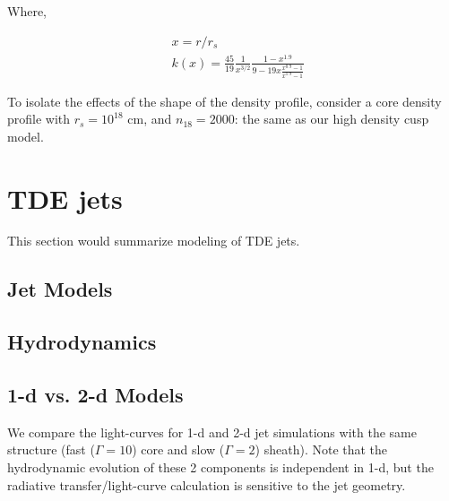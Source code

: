 \documentclass[usenatbib,fleqn]{mnras}
\newcommand{\Mbh}[1][]{M_{\bullet#1}}
\begin{document}
Where, 

\begin{align}
  &x=r/r_s\\\nonumber
  &k(x)=\frac{45}{19} \frac{1}{x^{3/2}} \frac{1-x^{1.9}}{9-19
      x\frac{x^{0.9}-1}{x^{1.9}-1}}
\end{align}

To isolate the effects of the shape of the density profile, consider a
core density profile with $r_s=10^{18}$ cm, and $n_{18}=2000$: the
same as our high density cusp model.



\section{TDE jets}
\label{sec:jet}
This section would summarize modeling of TDE jets.

\subsection{Jet Models}

\subsection{Hydrodynamics}

\subsection{1-d vs. 2-d Models}
\label{sec:2d}
We compare the light-curves for 1-d and 2-d jet simulations with the
same structure (fast ($\Gamma=10$) core and slow ($\Gamma=2$)
sheath). Note that the hydrodynamic evolution of these 2 components is
independent in 1-d, but the radiative transfer/light-curve calculation
is sensitive to the jet geometry.
\end{document}
